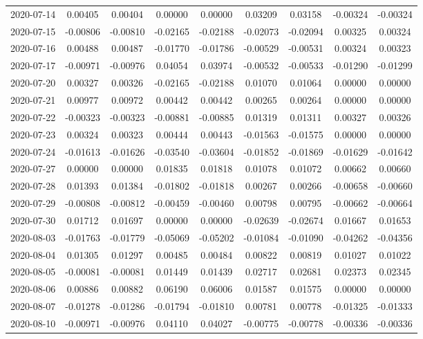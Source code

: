 {\begin{footnotesize}
\begin{longtable}{lcccccccc}
2020-07-14 & 0.00405 & 0.00404 & 0.00000 & 0.00000 & 0.03209 & 0.03158 & -0.00324 & -0.00324 \\
2020-07-15 & -0.00806 & -0.00810 & -0.02165 & -0.02188 & -0.02073 & -0.02094 & 0.00325 & 0.00324 \\
2020-07-16 & 0.00488 & 0.00487 & -0.01770 & -0.01786 & -0.00529 & -0.00531 & 0.00324 & 0.00323 \\
2020-07-17 & -0.00971 & -0.00976 & 0.04054 & 0.03974 & -0.00532 & -0.00533 & -0.01290 & -0.01299 \\
2020-07-20 & 0.00327 & 0.00326 & -0.02165 & -0.02188 & 0.01070 & 0.01064 & 0.00000 & 0.00000 \\
2020-07-21 & 0.00977 & 0.00972 & 0.00442 & 0.00442 & 0.00265 & 0.00264 & 0.00000 & 0.00000 \\
2020-07-22 & -0.00323 & -0.00323 & -0.00881 & -0.00885 & 0.01319 & 0.01311 & 0.00327 & 0.00326 \\
2020-07-23 & 0.00324 & 0.00323 & 0.00444 & 0.00443 & -0.01563 & -0.01575 & 0.00000 & 0.00000 \\
2020-07-24 & -0.01613 & -0.01626 & -0.03540 & -0.03604 & -0.01852 & -0.01869 & -0.01629 & -0.01642 \\
2020-07-27 & 0.00000 & 0.00000 & 0.01835 & 0.01818 & 0.01078 & 0.01072 & 0.00662 & 0.00660 \\
2020-07-28 & 0.01393 & 0.01384 & -0.01802 & -0.01818 & 0.00267 & 0.00266 & -0.00658 & -0.00660 \\
2020-07-29 & -0.00808 & -0.00812 & -0.00459 & -0.00460 & 0.00798 & 0.00795 & -0.00662 & -0.00664 \\
2020-07-30 & 0.01712 & 0.01697 & 0.00000 & 0.00000 & -0.02639 & -0.02674 & 0.01667 & 0.01653 \\
2020-08-03 & -0.01763 & -0.01779 & -0.05069 & -0.05202 & -0.01084 & -0.01090 & -0.04262 & -0.04356 \\
2020-08-04 & 0.01305 & 0.01297 & 0.00485 & 0.00484 & 0.00822 & 0.00819 & 0.01027 & 0.01022 \\
2020-08-05 & -0.00081 & -0.00081 & 0.01449 & 0.01439 & 0.02717 & 0.02681 & 0.02373 & 0.02345 \\
2020-08-06 & 0.00886 & 0.00882 & 0.06190 & 0.06006 & 0.01587 & 0.01575 & 0.00000 & 0.00000 \\
2020-08-07 & -0.01278 & -0.01286 & -0.01794 & -0.01810 & 0.00781 & 0.00778 & -0.01325 & -0.01333 \\
2020-08-10 & -0.00971 & -0.00976 & 0.04110 & 0.04027 & -0.00775 & -0.00778 & -0.00336 & -0.00336 \\

\end{longtable}
\end{footnotesize}}
